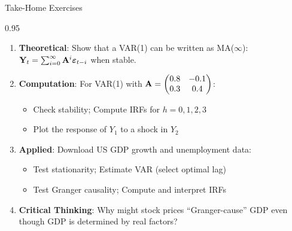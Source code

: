 \documentclass[9pt, aspectratio=169, t]{beamer}
\begin{document}
\begin{frame}{Take-Home Exercises}
    \begin{cminipage}{0.95\textwidth}
    {\footnotesize
    \begin{enumerate}\setlength{\itemsep}{2pt}
        \item \textbf{Theoretical}: Show that a VAR(1) can be written as MA($\infty$): $\mathbf{Y}_t = \sum_{i=0}^{\infty} \mathbf{A}^i \boldsymbol{\varepsilon}_{t-i}$ when stable.

        \item \textbf{Computation}: For VAR(1) with $\mathbf{A} = \begin{pmatrix} 0.8 & -0.1 \\ 0.3 & 0.4 \end{pmatrix}$:
            \begin{itemize}\setlength{\itemsep}{0pt}
                \item Check stability; Compute IRFs for $h = 0, 1, 2, 3$
                \item Plot the response of $Y_1$ to a shock in $Y_2$
            \end{itemize}

        \item \textbf{Applied}: Download US GDP growth and unemployment data:
            \begin{itemize}\setlength{\itemsep}{0pt}
                \item Test stationarity; Estimate VAR (select optimal lag)
                \item Test Granger causality; Compute and interpret IRFs
            \end{itemize}

        \item \textbf{Critical Thinking}: Why might stock prices ``Granger-cause'' GDP even though GDP is determined by real factors?
    \end{enumerate}
    }
    \end{cminipage}
\end{frame}
\end{document}
